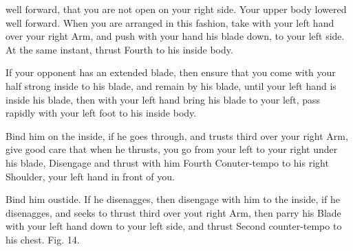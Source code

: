 \newpage


\newpage


well forward, that you are not open on your right side. Your upper body lowered well forward. When you are arranged in this fashion, take with your left hand over your right Arm, and push with your hand his blade down, to your left side. At the same instant, thrust Fourth to his inside body.

\exercise{}

If your opponent has an extended blade, then ensure that you come with
your half strong inside to his blade, and remain by his blade, until
your left hand is inside his blade, then with your left hand bring his
blade to your left, pass rapidly with your left foot to his inside
body.

\exercise{}

Bind him on the inside, if he goes through, and trusts third over your
right Arm, give good care that when he thrusts, you go from your left
to your right under his blade, Disengage and thrust with him Fourth
Conuter-tempo to his right Shoulder, your left hand in front of you.

\exercise{}
Bind him oustide. If he disenagges, then disengage with him to the
inside, if he disenagges, and seeks to thrust third over yout right
Arm, then parry his Blade with your left hand down to your left side,
and thrust Second counter-tempo to his chest. Fig. 14.


